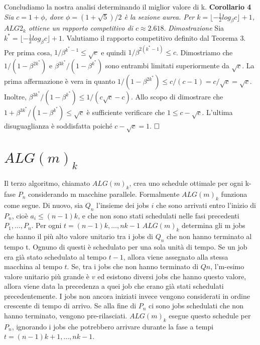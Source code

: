 \documentclass[12pt]{article}
\begin{document}
Concludiamo la nostra analisi determinando il miglior valore di k.
\newline \newline
\textbf{Corollario 4}
\textit{Sia $c = 1 + \phi$, dove $\phi = (1 + \sqrt{5}) / 2$ è la sezione aurea. Per $k = \lfloor -\frac{1}{2} log_{\beta} c \rfloor + 1$, $ALG2_{k}$ ottiene un rapporto competitivo di $c \approx 2.618.$}
\newline \newline
\textit{Dimostrazione}
Sia $k^{*}  = \lfloor -\frac{1}{2} log_{\beta} c \rfloor + 1$. Valutiamo il rapporto competitivo definito dal Teorema 3. Per prima cosa, $1 / \beta^{k^{*}-1} \leq \sqrt{c}$ e quindi $1 / \beta^{2 (k^{*}  -1)} \leq c$. Dimostriamo che $1 / (1 - \beta^{2k^{*}})$ e $\beta^{3k^{*}} / (1 - \beta^{k^{*}})$ sono entrambi limitati superiormente da $\sqrt{c}$. La prima affermazione è vera in quanto $1 / (1 - \beta^{2k^{*}}) \leq c / (c - 1) = c / \sqrt{c} = \sqrt{c}$. Inoltre, $\beta^{3k^{*}} / (1 - \beta^{k^{*}}) \leq 1 / (c\sqrt{c} - c)$. Allo scopo di dimostrare che $1 + \beta^{3k^{*}} / (1 - \beta^{k^{*}}) \leq \sqrt{c}$ è sufficiente verificare che $1 \leq c - \sqrt{c}$. L'ultima disuguaglianza è soddisfatta poiché $c - \sqrt{c} = 1$. $\hfill \square$


\section{$ALG(m)_{k}$}
Il terzo algoritmo, chiamato $ALG(m)_{k}$, crea uno schedule ottimale per ogni k-fase $P_{n}$ considerando m macchine parallele. Formalmente $ALG(m)_{k}$ funziona come segue. Di nuovo, sia $Q_{n}$ l’insieme dei jobs $i$ che sono arrivati entro l’inizio di $P_{n}$, cioè $a_{i} \leq (n - 1)k$, e che non sono stati schedulati nelle fasi precedenti $P_{1}, … , P_{n}$. Per ogni $t = (n-1)k, … , nk - 1$ $ALG(m)_{k}$ determina gli m jobs che hanno il più alto valore unitario tra i jobs di $Q_{n}$ che non hanno terminato al tempo t. Ognuno di questi è schedulato per una sola unità di tempo. Se un job era già stato schedulato al tempo $t-1$, allora viene assegnato alla stessa macchina al tempo $t$. Se, tra i jobs che non hanno terminato di $Qn$, l’m-esimo valore unitario più grande è $v$ ed esistono diversi jobs che hanno questo valore, allora viene data la precedenza a quei job che erano già stati schedulati precedentemente. I jobs non ancora iniziati invece vengono considerati in ordine crescente di tempo di arrivo. Se alla fine di $P_{n}$ ci sono jobs schedulati che non hanno terminato, vengono pre-rilasciati. $ALG(m)_{k}$ esegue questo schedule per $P_{n}$, ignorando i jobs che potrebbero arrivare durante la fase a tempi $t = (n-1)k + 1, …, nk - 1$.
\end{document}
